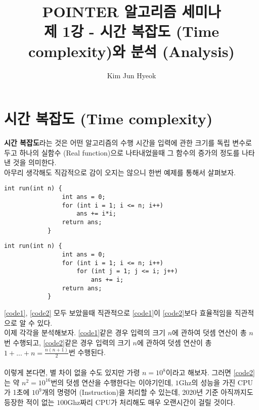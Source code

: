 \documentclass{article}
\begin{document}
    \title{%
        POINTER 알고리즘 세미나 \\
        \large 제 1강 - 시간 복잡도 (Time complexity)와 분석 (Analysis)}
    \author{Kim Jun Hyeok}
    \maketitle
    \section{시간 복잡도 (Time complexity)}
        \linespread{1.25}
        \textbf{시간 복잡도}라는 것은 어떤 알고리즘의 수행 시간을 입력에 관한 크기를 독립 변수로 두고 하나의 실함수 (Real function)으로 나타내었을때 그 함수의 증가의 정도를 나타낸 것을 의미한다. \\
        아무리 생각해도 직감적으로 감이 오지는 않으니 한번 예제를 통해서 살펴보자.
        \begin{lstlisting}[label=code1,caption={$1^{2} + ... + n^{2}$을 반환하는 코드이고 시간복잡도는 $O(n)$이다.}]
            int run(int n) {
                int ans = 0;
                for (int i = 1; i <= n; i++)
                    ans += i*i;
                return ans;
            }
        \end{lstlisting}
        \begin{lstlisting}[label=code2,caption={$1^{2} + ... + n^{2}$을 반환하는 코드이고 시간복잡도는 $O(n^{2})$이다.}]
            int run(int n) {
                int ans = 0;
                for (int i = 1; i <= n; i++)
                    for (int j = 1; j <= i; j++)
                        ans += i;
                return ans;
            }
        \end{lstlisting}
        \ref{code1}, \ref{code2} 모두 보았을때 직관적으로 \ref{code1}이 \ref{code2}보다 효율적임을 직관적으로 알 수 있다. \\
        이제 각각을 분석해보자. \ref{code1}같은 경우 입력의 크기 $n$에 관하여 덧셈 연산이 총 $n$번 수행되고, \ref{code2}같은 경우 입력의 크기 $n$에 관하여 덧셈 연산이 총 $1 + ... + n = \frac{n(n+1)}{2}$번 수행된다. \\ \\

        이렇게 본다면, 별 차이 없을 수도 있지만 가령 $n=10^8$이라고 해보자. 
        그러면 \ref{code2}는 약 $n^{2}=10^{16}$번의 덧셈 연산을 수행한다는 이야기인데, $1$Ghz의 성능을 가진 CPU가 1초에 $10^9$개의 명령어 (Instruction)을 처리할 수 있는데, 2020년 기준 아직까지도 등장한 적이 없는 $100$Ghz짜리 CPU가 처리해도 매우 오랜시간이 걸릴 것이다. \\ \\
\end{document}
